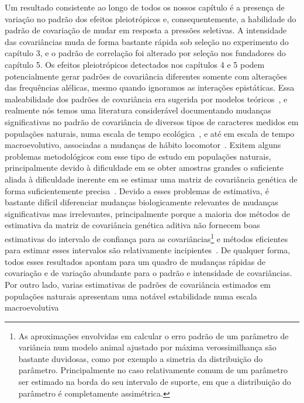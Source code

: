 \begin{refsection}
Um resultado consistente ao longo de todos os nossos capítulo é a presença de
variação no padrão dos efeitos pleiotrópicos e, consequentemente, a habilidade
do padrão de covariação de mudar em resposta a pressões seletivas. A
intensidade das covariâncias muda de forma bastante rápida sob seleção no
experimento do capítulo 3, e o padrão de correlação foi alterado por seleção
nos fundadores do capítulo 5. Os efeitos pleiotrópicos detectados nos
capítulos 4 e 5 podem potencialmente gerar padrões de covariância diferentes
somente com alterações das frequências alélicas, mesmo quando ignoramos as
interações epistáticas. Essa maleabilidade dos padrões de covariância era
sugerida por modelos teóricos~\parencite{Barton1989-ag, Arnold2008-pc}, e
realmente nós temos uma literatura considerável documentando mudanças
significativas no padrão de covariância de diversos tipos de caracteres
medidos em populações naturais, numa escala de tempo
ecológica~\parencite{Merila1996-rw, Doroszuk2008-qe, Bjorklund2013-io,
Pfrender2000-if, Eroukhmanoff2011-ph}, e até em escala de tempo
macroevolutivo, associadas a mudanças de hábito
locomotor~\parencite{Young2005-nk, Young2010-rm}. Exitem alguns problemas
metodológicos com esse tipo de estudo em populações naturais, principalmente
devido à dificuldade em se obter amostras grandes o suficiente aliada à
dificuldade inerente em se estimar uma matriz de covariância genética de forma
suficientemente precisa~\parencite{Marroig2012-jd}. Devido a esses problemas
de estimativa, é bastante difícil diferenciar mudanças biologicamente
relevantes de mudanças significativas mas irrelevantes, principalmente porque
a maioria dos métodos de estimativa da matriz de covariância genética aditiva
não fornecem boas estimativas do intervalo de confiança para as
covariâncias\footnote{As aproximações envolvidas em calcular o erro padrão de
um parâmetro de variância num modelo animal ajustado por máxima
verossimilhança são bastante duvidosas, como por exemplo a simetria da
distribuição do parâmetro. Principalmente no caso relativamente comum de um
parâmetro ser estimado na borda do seu intervalo de suporte, em que a
distribuição do parâmetro é completamente assimétrica.} e métodos eficientes
para estimar esses intervalos são relativamente
incipientes~\parencite{Houle2015-jb, Runcie2013-nr}. De qualquer forma, todos
esses resultados apontam para um quadro de mudanças rápidas de covariação e de
variação abundante para o padrão e intensidade de covariâncias. Por outro
lado, varias estimativas de padrões de covariância estimados em populações
naturais apresentam uma notável estabilidade numa escala macroevolutiva

\end{refsection}
